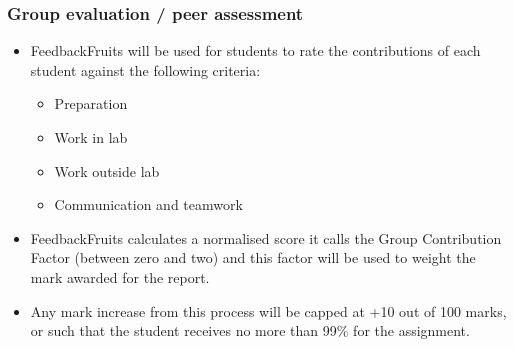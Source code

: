 \documentclass[9pt]{beamer-control}
\begin{document}
\begin{frame}
  \frametitle{Group evaluation / peer assessment}
  \begin{itemize}
    \item FeedbackFruits will be used for students to rate the contributions of each student against the following criteria:
      \begin{itemize}
        \item Preparation
        \item Work in lab
        \item Work outside lab
        \item Communication and teamwork
      \end{itemize}
    \item FeedbackFruits calculates a normalised score it calls the Group Contribution Factor (between zero and two) and this factor will be used to weight the mark awarded for the report.
    \item Any mark increase from this process will be capped at +10 out of 100 marks, or such that the student receives no more than 99\% for the assignment.
  \end{itemize}
\end{frame}

\SUMMARYFRAME
\end{document}

